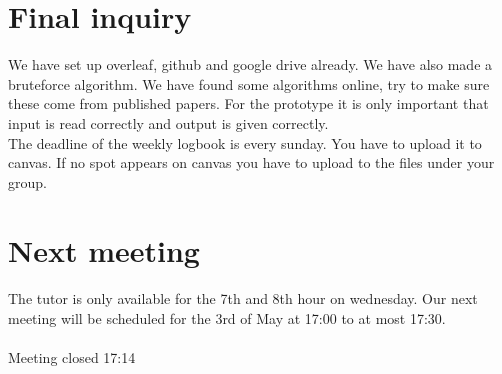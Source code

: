 \documentclass[a4paper,twoside,11pt]{article}
\begin{document}
	\section{Final inquiry}
	
	We have set up overleaf, github and google drive already. We have also made a bruteforce algorithm. We have found some algorithms online, try to make sure these come from published papers. For the prototype it is only important that input is read correctly and output is given correctly. \\
	The deadline of the weekly logbook is every sunday. You have to upload it to canvas. If no spot appears on canvas you have to upload to the files under your group. 
	
	\section{Next meeting}
	
	The tutor is only available for the 7th and 8th hour on wednesday. Our next meeting will be scheduled for the 3rd of May at 17:00 to at most 17:30. 
	\\\\
	Meeting closed 17:14

	
\end{document}
